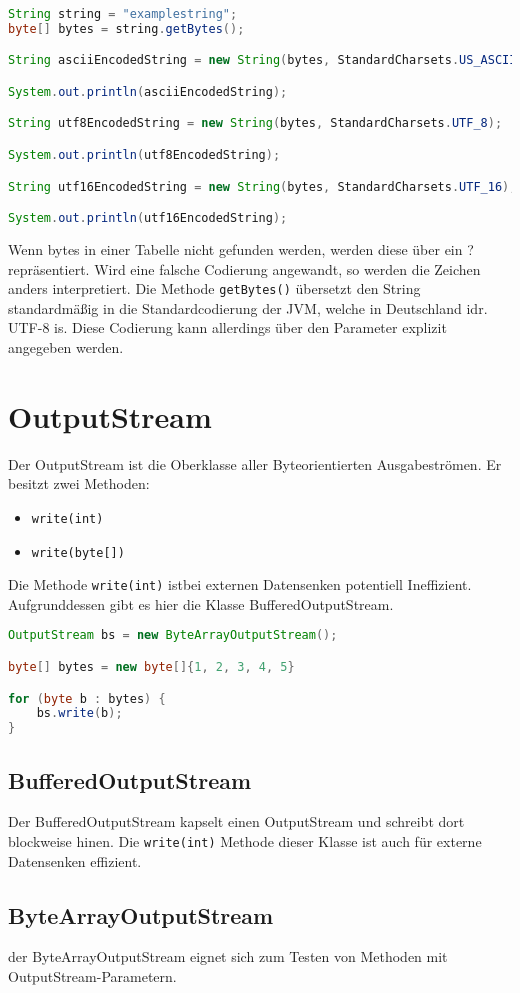 \begin{lstlisting}[language=Java, caption={Beispiel für String Codierung ändern}]
String string = "examplestring";
byte[] bytes = string.getBytes();

String asciiEncodedString = new String(bytes, StandardCharsets.US_ASCII);

System.out.println(asciiEncodedString); 

String utf8EncodedString = new String(bytes, StandardCharsets.UTF_8);

System.out.println(utf8EncodedString);  

String utf16EncodedString = new String(bytes, StandardCharsets.UTF_16);

System.out.println(utf16EncodedString); 
\end{lstlisting}

Wenn bytes in einer Tabelle nicht gefunden werden, werden diese über ein ?
repräsentiert. Wird eine falsche Codierung angewandt, so werden die Zeichen
anders interpretiert. Die Methode \lstinline{getBytes()} übersetzt den String
standardmäßig in die Standardcodierung der JVM, welche in Deutschland idr.
UTF-8 is. Diese Codierung kann allerdings über den Parameter explizit angegeben
werden.

\section{OutputStream}

Der OutputStream ist die Oberklasse aller Byteorientierten Ausgabeströmen. Er
besitzt zwei Methoden:
\begin{itemize}
    \item \lstinline{write(int)}
    \item \lstinline{write(byte[])}
\end{itemize}

Die Methode \lstinline{write(int)} istbei externen Datensenken potentiell
Ineffizient. Aufgrunddessen gibt es hier die Klasse BufferedOutputStream.

\begin{lstlisting}[language=Java, caption={Beispiel für OutputStream}]
OutputStream bs = new ByteArrayOutputStream();

byte[] bytes = new byte[]{1, 2, 3, 4, 5}

for (byte b : bytes) {
    bs.write(b);
}
\end{lstlisting}

\subsection{BufferedOutputStream}

Der BufferedOutputStream kapselt einen OutputStream und schreibt dort
blockweise hinen. Die \lstinline{write(int)} Methode dieser Klasse ist auch für
externe Datensenken effizient.

\subsection{ByteArrayOutputStream}

der ByteArrayOutputStream eignet sich zum Testen von Methoden mit
OutputStream-Parametern.